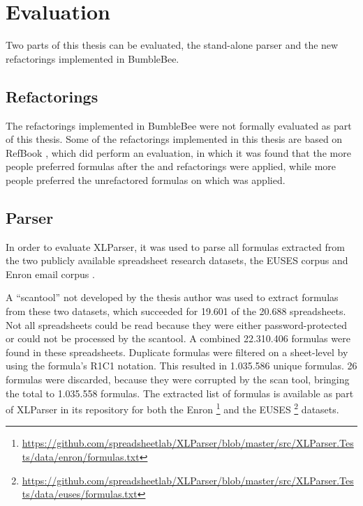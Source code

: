 
\chapter{Evaluation}
\label{chapter:evaluation}

Two parts of this thesis can be evaluated, the stand-alone parser and the new refactorings implemented in BumbleBee.

\section{Refactorings}

The refactorings implemented in BumbleBee were not formally evaluated as part of this thesis.
Some of the refactorings implemented in this thesis are based on RefBook \cite{badame2012refactoring}, which did perform an evaluation, in which it was found that the more people preferred formulas after the  and  refactorings were applied, while more people preferred the unrefactored formulas on which  was applied.

\section{Parser}

In order to evaluate XLParser, it was used to parse all formulas extracted from the two publicly available spreadsheet research datasets, the EUSES corpus \cite{fisher2005euses} and Enron email corpus \cite{klimt2004enron, hermans2015enron}.

A ``scantool'' not developed by the thesis author was used to extract formulas from these two datasets, which succeeded for 19.601 of the 20.688 spreadsheets.
Not all spreadsheets could be read because they were either password-protected or could not be processed by the scantool.
A combined 22.310.406 formulas were found in these spreadsheets.
Duplicate formulas were filtered on a sheet-level by using the formula's R1C1 notation.
This resulted in 1.035.586 unique formulas.
26 formulas were discarded, because they were corrupted by the scan tool, bringing the total to 1.035.558 formulas.
The extracted list of formulas is available as part of XLParser in its repository for both the Enron \footnote{\url{https://github.com/spreadsheetlab/XLParser/blob/master/src/XLParser.Tests/data/enron/formulas.txt}} and the EUSES \footnote{\url{https://github.com/spreadsheetlab/XLParser/blob/master/src/XLParser.Tests/data/euses/formulas.txt}} datasets.

